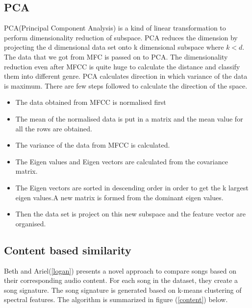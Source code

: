 \documentclass[12pt]{article}
\begin{document}
\subsection{PCA}
PCA(Principal Component Analysis) is a kind of linear transformation to perform dimensionality reduction of subspace. PCA reduces the dimension by projecting the d dimensional data set onto k dimensional subspace where $k<d$.
The data that we got from MFC is passed on to PCA. The dimensionality reduction even after MFCC is quite huge to calculate the distance and classify them into different genre.
PCA calculates direction in which variance of the data is maximum. There are few steps followed to calculate the direction of the space.
\begin{itemize}
  \item The data obtained from MFCC is normalised first
  \item The mean of the normalised data is put in a matrix and the mean value for all the rows are obtained.
  \item The variance of the data from MFCC is calculated.
  \item The Eigen values and Eigen vectors are calculated from the covariance matrix.
  \item The Eigen vectors are sorted in descending order in order to get the k largest eigen values.A new matrix is formed from the dominant eigen values.
  \item Then the data set is project on this new subspace and the feature vector are organised.
\end{itemize}
\subsection{Content based similarity}
Beth and Ariel(\ref{logan}) presents a novel approach to compare songs based on their corresponding audio content. For each song in the dataset, they create a song signature. The song signature is generated based on k-means clustering of spectral features. The algorithm is summarized in figure (\ref{content}) below.
\end{document}
